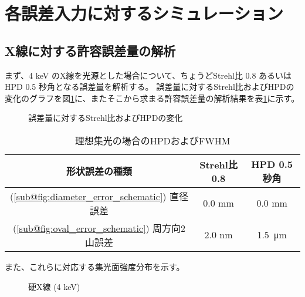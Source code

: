 \clearpage
\newpage

\section{各誤差入力に対するシミュレーション}
\label{chap2_simulation_error_response}

\subsection{X線に対する許容誤差量の解析}
\label{chap2_xray_allowed_error}

まず、4 keV のX線を光源とした場合について、ちょうどStrehl比 0.8 あるいはHPD 0.5 秒角となる誤差量を解析する。
誤差量に対するStrehl比およびHPDの変化のグラフを図\ref{fig:xray_allowed_error_analysis}に、またそこから求まる許容誤差量の解析結果を表\ref{tb:xray_allowed_error}に示す。

\begin{figure}[!ht]
\centering
{}
\caption[]{誤差量に対するStrehl比およびHPDの変化}
\label{fig:xray_allowed_error_analysis}
\end{figure}

\begin{table}[!ht]
\begin{center}
  \caption{理想集光の場合のHPDおよびFWHM}
  \begin{tabular}{|c|c|c|} \hline
    形状誤差の種類 & Strehl比0.8 & HPD 0.5 秒角 \\ \hline
    (\ref{sub@fig:diameter_error_schematic}) 直径誤差 & 0.0 mm & 0.0 mm \\
    (\ref{sub@fig:oval_error_schematic}) 周方向2山誤差 & 2.0 nm & \SI{1.5}{\micro \metre}
  \end{tabular}
  \label{tb:xray_allowed_error}
\end{center}
\end{table}

また、これらに対応する集光面強度分布を示す。

\begin{figure}[!ht]
\centering
{}
\caption[]{硬X線 (4 keV)}
\label{fig:xray_just_allowed_focus}
\end{figure}


